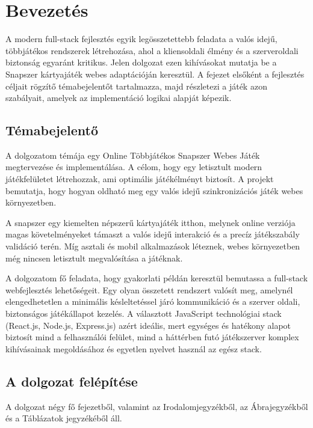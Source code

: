 
\chapter{Bevezetés}
\label{ch:intro}

A modern full-stack fejlesztés egyik legösszetettebb feladata a valós idejű,
 többjátékos rendszerek létrehozása, ahol a kliensoldali élmény és a szerveroldali
  biztonság egyaránt kritikus. Jelen dolgozat ezen kihívásokat mutatja be
   a Snapszer kártyajáték webes adaptációján keresztül. 
   A fejezet elsőként a fejlesztés céljait rögzítő témabejelentőt tartalmazza, 
   majd részletezi a játék azon szabályait, amelyek az implementáció logikai
    alapját képezik.

\section{Témabejelentő}
A dolgozatom témája egy Online Többjátékos Snapszer Webes Játék megtervezése és implementálása. A célom, hogy egy letisztult modern játékfelületet létrehozzak, ami optimális játékélményt biztosít. A projekt bemutatja, hogy hogyan oldható meg egy valós idejű szinkronizációs játék webes környezetben.

A snapszer egy kiemelten népszerű kártyajáték itthon, melynek online verziója magas követelményeket támaszt a valós idejű interakció és a precíz játékszabály validáció terén. Míg asztali és mobil alkalmazások léteznek, webes környezetben még nincsen letisztult megvalósítása a játéknak.

A dolgozatom fő feladata, hogy gyakorlati példán keresztül bemutassa a full-stack webfejlesztés lehetőségeit. Egy olyan összetett rendszert valósít meg, amelynél elengedhetetlen a minimális késleltetéssel járó kommunikáció és a szerver oldali, biztonságos játékállapot kezelés. A választott JavaScript technológiai stack (React.js, Node.js, Express.js) azért ideális, mert egységes és hatékony alapot biztosít mind a felhasználói felület, mind a háttérben futó játékszerver komplex kihívásainak megoldásához és egyetlen nyelvet használ az egész stack.

\section{A dolgozat felépítése}

A dolgozat négy fő fejezetből, valamint az Irodalomjegyzékből, az Ábrajegyzékből és a Táblázatok jegyzékéből áll.


